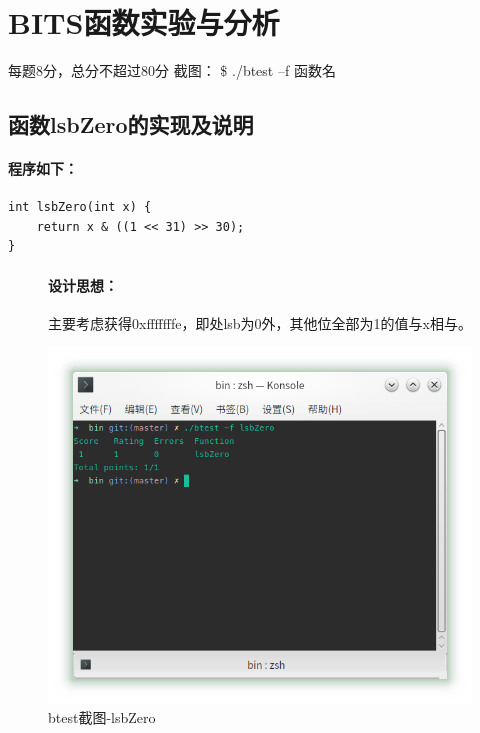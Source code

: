\section{BITS函数实验与分析}
\begin{center}
    每题8分，总分不超过80分
    截图：  \$ ./btest –f 函数名
\end{center}

\subsection{函数lsbZero的实现及说明}

\paragraph{程序如下：}
\begin{verbatim}
int lsbZero(int x) {
    return x & ((1 << 31) >> 30);
}
\end{verbatim}

\begin{figure}[H]
\begin{minipage}[c]{0.5\linewidth}
\paragraph{设计思想：}主要考虑获得0xfffffffe，即处lsb为0外，其他位全部为1的值与x相与。
\end{minipage}
\begin{minipage}[c]{0.4\linewidth}
\centering
\includegraphics[width=0.9\linewidth]{figures/lsbZero}
\caption{btest截图-lsbZero}
\label{fig:lsbzero}
\end{minipage}
\end{figure}

